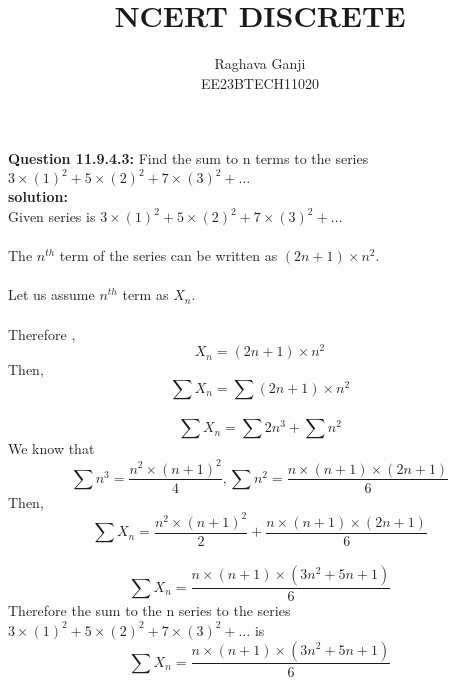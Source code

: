 \documentclass[joournal,12pt,twocolumn]{IEEEtran}
\title{NCERT DISCRETE}
\author{Raghava Ganji\\EE23BTECH11020}
\date{}
\begin{document}
\maketitle
\newpage
\bigskip
\textbf{Question 11.9.4.3:}
Find the sum to n terms to the series $3\times(1)^2+5\times(2)^2+7\times(3)^2+ \ldots$\\
\textbf{solution:}\\
Given series is $3\times(1)^2+5\times(2)^2+7\times(3)^2+ \ldots$\\\\
The $n^{th}$ term of the series can be written as $(2n+1)\times n^2$.\\\\
Let us assume $n^{th}$ term as $X_n$.\\\\
Therefore ,
\begin{equation}
\tag{1}
X_n=(2n+1)\times n^2
\end{equation}
Then,
\begin{equation}
\tag{2}
\sum X_n=\sum (2n+1)\times n^2
\end{equation}\\
\begin{equation}
\tag{3}
\sum X_n=\sum 2n^3 +\sum n^2
\end{equation}
We know that 
\begin{equation}
\tag{4}
\sum n^3=\frac{n^2\times(n+1)^2}{4}, \sum n^2=\frac{n\times(n+1)\times(2n+1)}{6}
\end{equation}
Then,
\begin{equation}
\tag{5}
\sum X_n=\frac{n^2\times(n+1)^2}{2} +\frac{n\times(n+1)\times(2n+1)}{6}
\end{equation}\\
\begin{equation}
\tag{6}
\sum X_n=\frac{n\times(n+1)\times(3n^2+5n+1)}{6}
\end{equation} 
Therefore the sum to the n series to the series $3\times(1)^2+5\times(2)^2+7\times(3)^2+\ldots$ is 
\begin{equation}
\tag{6}
\sum X_n=\frac{n\times(n+1)\times(3n^2+5n+1)}{6}
\end{equation}
\end{document}
